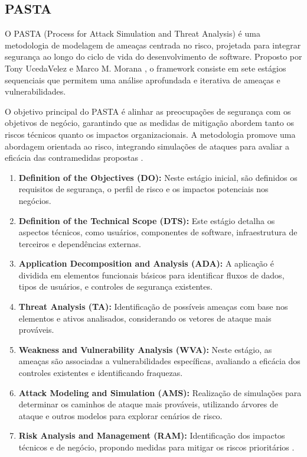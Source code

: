 \subsection{PASTA}
\label{subsec:pasta}

O PASTA (Process for Attack Simulation and Threat Analysis) é uma
metodologia de modelagem de ameaças centrada no risco, projetada para
integrar segurança ao longo do ciclo de vida do desenvolvimento de
software. Proposto por Tony UcedaVelez e Marco M. Morana
\cite{RiskCentricThreatModeling}, o framework consiste em sete
estágios sequenciais que permitem uma análise aprofundada e iterativa
de ameaças e vulnerabilidades.

O objetivo principal do PASTA é alinhar as preocupações de segurança
com os objetivos de negócio, garantindo que as medidas de mitigação
abordem tanto os riscos técnicos quanto os impactos organizacionais.
A metodologia promove uma abordagem orientada ao risco, integrando
simulações de ataques para avaliar a eficácia das contramedidas
propostas \cite{RiskCentricThreatModeling}.

\begin{enumerate}
    \item \textbf{Definition of the Objectives (DO):} Neste estágio
inicial, são definidos os requisitos de segurança, o perfil de risco e
os impactos potenciais nos negócios.
    \item \textbf{Definition of the Technical Scope (DTS):} Este
estágio detalha os aspectos técnicos, como usuários, componentes de
software, infraestrutura de terceiros e dependências externas.
    \item \textbf{Application Decomposition and Analysis (ADA):} A
aplicação é dividida em elementos funcionais básicos para identificar
fluxos de dados, tipos de usuários, e controles de segurança
existentes.
    \item \textbf{Threat Analysis (TA):} Identificação de possíveis
ameaças com base nos elementos e ativos analisados, considerando os
vetores de ataque mais prováveis.
    \item \textbf{Weakness and Vulnerability Analysis (WVA):} Neste
estágio, as ameaças são associadas a vulnerabilidades específicas,
avaliando a eficácia dos controles existentes e identificando
fraquezas.
    \item \textbf{Attack Modeling and Simulation (AMS):} Realização de
simulações para determinar os caminhos de ataque mais prováveis,
utilizando árvores de ataque e outros modelos para explorar cenários
de risco.
    \item \textbf{Risk Analysis and Management (RAM):} Identificação
dos impactos técnicos e de negócio, propondo medidas para mitigar os
riscos prioritários \cite{RiskCentricThreatModeling}.
\end{enumerate}


